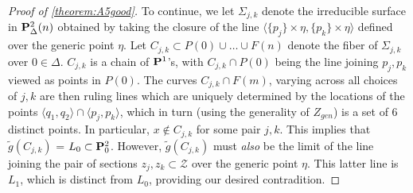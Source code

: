 \documentclass[12pt,reqno]{amsart}
\numberwithin{equation}{section}
\newcommand{\td}{\widetilde}
\begin{document}
\begin{proof}[Proof of \autoref{theorem:A5good}]
  
  To continue, we let $\Sigma_{j,k}$ denote the irreducible surface in
  $\P^{2}_{\Delta}(n)$ obtained by taking the closure of the line
  $\langle \{p_{j}\} \times \eta, \{p_{k}\} \times \eta \rangle$
  defined over the generic point $\eta$.  Let
  $C_{j,k} \subset P(0) \cup \dots \cup F(n)$ denote the fiber of
  $\Sigma_{j,k}$ over $0 \in \Delta$. $C_{j,k}$ is a chain of
  $\P^{1}$'s, with $C_{j,k} \cap P(0)$ being the line joining
  $p_{j}, p_{k}$ viewed as points in $P(0)$. The curves
  $C_{j,k} \cap F(m)$, varying across all choices of $j,k$ are then
  ruling lines which are uniquely determined by the locations of the
  points
  $\langle q_{1}, q_{2} \rangle \cap \langle p_{j}, p_{k} \rangle$,
  which in turn (using the generality of $Z_{gen}$) is a set of $6$
  distinct points.  In particular, $x \notin C_{j,k}$ for some pair
  $j,k$.  This implies that $\td{g}(C_{j,k})$ =
  $L_{0} \subset \P^{2}_{0}$.  However, $\td{g}(C_{j,k})$ must {\sl
    also} be the limit of the line joining the pair of sections
  $z_{j}, z_{k} \subset \mathcal{Z}$ over the generic point $\eta$.
  This latter line is $L_{1}$, which is distinct from $L_0$, providing
  our desired contradition.
\end{proof}






\end{document}
